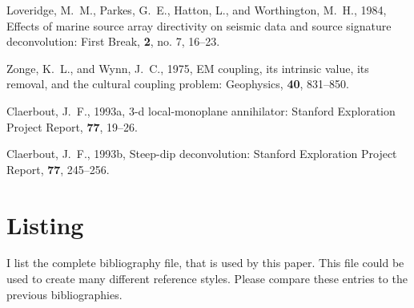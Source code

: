 \begin{thebibliography}{}
Loveridge, M.~M., Parkes, G.~E., Hatton, L.,  and Worthington, M.~H., 1984,
  Effects of marine source array directivity on seismic data and source
  signature deconvolution: First Break, {\bf 2}, no. 7, 16--23.

Zonge, K.~L., and Wynn, J.~C., 1975, {EM} coupling, its intrinsic value, its
  removal, and the cultural coupling problem: Geophysics, {\bf 40}, 831--850.

Claerbout, J.~F., 1993a, 3-d local-monoplane annihilator: Stanford Exploration
  Project Report, {\bf 77}, 19--26.

Claerbout, J.~F., 1993b, Steep-dip deconvolution: Stanford Exploration Project
  Report, {\bf 77}, 245--256.

\end{thebibliography}

\appendix
\section*{Listing}
I list the complete bibliography file, that is used by this paper.
This file could be used to create many different reference styles.
Please compare these entries to the previous bibliographies.

